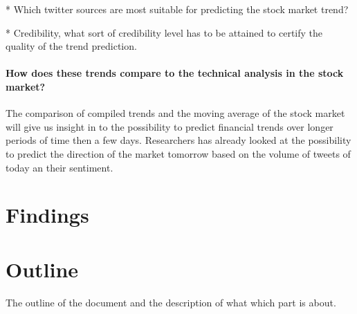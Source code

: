 * Which twitter sources are most suitable for predicting the stock market
trend?

* Credibility, what sort of credibility level has to be attained to certify the
quality of the trend prediction. 

	\paragraph{How does these trends compare to the technical analysis in the
stock market?\\}
	The comparison of compiled trends and the moving average of the stock
market will  give us insight in to the possibility to predict financial trends
over longer periods of time then a few days. Researchers has already looked at
the possibility to predict the direction of the market tomorrow based on the
volume of tweets of today an their sentiment. 

\section{Findings}

\section{Outline}
The outline of the document and the description of what which part is about. 



